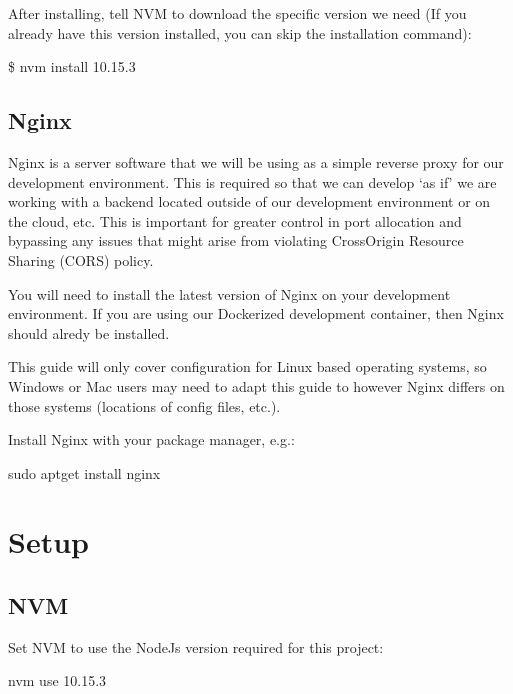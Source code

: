 \documentclass[letterpaper,10pt,english]{sphinxmanual}
\begin{document}
\sphinxAtStartPar
After installing, tell NVM to download the specific version we need (If you already have this version installed, you can skip the installation command):
\begin{sphinxalltt}
\$ nvm install 10.15.3
\end{sphinxalltt}


\section{Nginx}
\label{\detokenize{install:nginx}}
\sphinxAtStartPar
{}

\sphinxAtStartPar
Nginx is a server software that we will be using as a simple reverse proxy for our development environment. This is required so that we can develop ‘as if’ we are working with a backend located outside of our development environment or on the cloud, etc. This is important for greater control in port allocation and bypassing any issues that might arise from violating Cross\sphinxhyphen{}Origin Resource Sharing (CORS) policy.

\sphinxAtStartPar
You will need to install the latest version of Nginx on your development environment. If you are using our Dockerized development container, then Nginx should alredy be installed.

\sphinxAtStartPar
This guide will only cover configuration for Linux based operating systems, so Windows or Mac users may need to adapt this guide to however Nginx differs on those systems (locations of config files, etc.).

\sphinxAtStartPar
Install Nginx with your package manager, e.g.:

\begin{sphinxVerbatim}[commandchars=\\\{\}]
\PYGZdl{} sudo apt\PYGZhy{}get install nginx
\end{sphinxVerbatim}

\sphinxstepscope


\chapter{Setup}
\label{\detokenize{setup:setup}}\label{\detokenize{setup::doc}}

\section{NVM}
\label{\detokenize{setup:nvm}}
\sphinxAtStartPar
Set NVM to use the NodeJs version required for this project:
\begin{sphinxalltt}
nvm use 10.15.3
\end{sphinxalltt}
\end{document}
